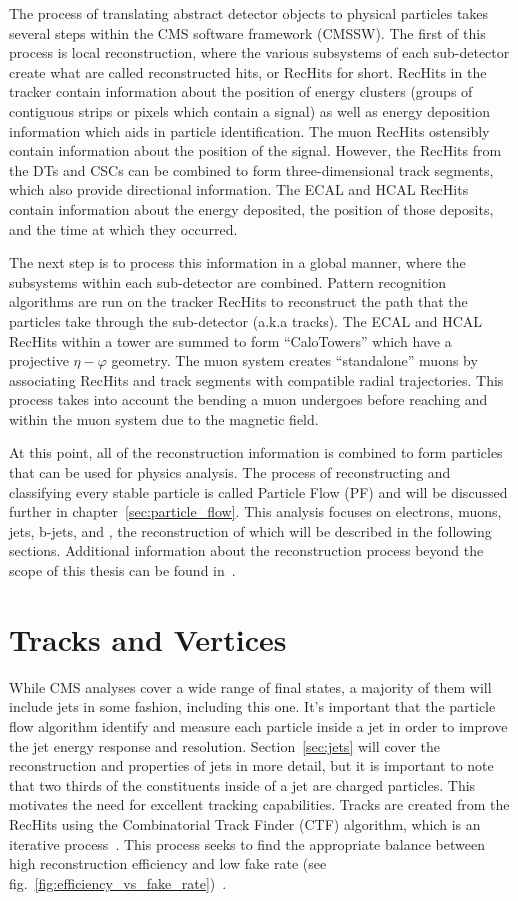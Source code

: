 The process of translating abstract detector objects to physical particles takes several steps within the CMS software framework (CMSSW).
The first of this process is local reconstruction, where the various subsystems of each sub-detector create what are called reconstructed hits, or RecHits for short.
RecHits in the tracker contain information about the position of energy clusters (groups of contiguous strips or pixels which contain a signal) as well as energy deposition information which aids in particle identification.
The muon RecHits ostensibly contain information about the position of the signal.
However, the RecHits from the DTs and CSCs can be combined to form three-dimensional track segments, which also provide directional information.
The ECAL and HCAL RecHits contain information about the energy deposited, the position of those deposits, and the time at which they occurred.

The next step is to process this information in a global manner, where the subsystems within each sub-detector are combined.
Pattern recognition algorithms are run on the tracker RecHits to reconstruct the path that the particles take through the sub-detector (a.k.a tracks).
The ECAL and HCAL RecHits within a tower are summed to form ``CaloTowers'' which have a projective $\eta-\varphi$ geometry.
The muon system creates ``standalone'' muons by associating RecHits and track segments with compatible radial trajectories.
This process takes into account the bending a muon undergoes before reaching and within the muon system due to the magnetic field.

At this point, all of the reconstruction information is combined to form particles that can be used for physics analysis.
The process of reconstructing and classifying every stable particle is called Particle Flow (PF) and will be discussed further in chapter~\ref{sec:particle_flow}.
This analysis focuses on electrons, muons, jets, b-jets, and \ETslash, the reconstruction of which will be described in the following sections.
Additional information about the reconstruction process beyond the scope of this thesis can be found in~\cite{TDR-software}.

\section{Tracks and Vertices}
\label{sec:tracks_and_vertices}

While CMS analyses cover a wide range of final states, a majority of them will include jets in some fashion, including this one.
It's important that the particle flow algorithm identify and measure each particle inside a jet in order to improve the jet energy response and resolution.
Section~\ref{sec:jets} will cover the reconstruction and properties of jets in more detail, but it is important to note that two thirds of the constituents inside of a jet are charged particles.
This motivates the need for excellent tracking capabilities.
Tracks are created from the RecHits using the Combinatorial Track Finder (CTF) algorithm, which is an iterative process~\cite{TRK-11-001}.
This process seeks to find the appropriate balance between high reconstruction efficiency and low fake rate (see fig.~\ref{fig:efficiency_vs_fake_rate})~\cite{CMS-PAS-PFT-09-001}.

